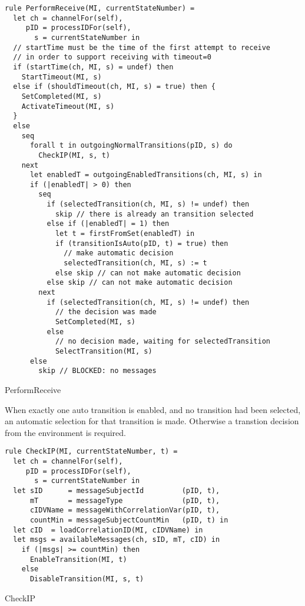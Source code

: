 \begin{listing}[H]
\begin{verbatim}
rule PerformReceive(MI, currentStateNumber) =
  let ch = channelFor(self),
     pID = processIDFor(self),
       s = currentStateNumber in
  // startTime must be the time of the first attempt to receive
  // in order to support receiving with timeout=0
  if (startTime(ch, MI, s) = undef) then
    StartTimeout(MI, s)
  else if (shouldTimeout(ch, MI, s) = true) then {
    SetCompleted(MI, s)
    ActivateTimeout(MI, s)
  }
  else
    seq
      forall t in outgoingNormalTransitions(pID, s) do
        CheckIP(MI, s, t)
    next
      let enabledT = outgoingEnabledTransitions(ch, MI, s) in
      if (|enabledT| > 0) then
        seq
          if (selectedTransition(ch, MI, s) != undef) then
            skip // there is already an transition selected
          else if (|enabledT| = 1) then
            let t = firstFromSet(enabledT) in
            if (transitionIsAuto(pID, t) = true) then
              // make automatic decision
              selectedTransition(ch, MI, s) := t
            else skip // can not make automatic decision
          else skip // can not make automatic decision
        next
          if (selectedTransition(ch, MI, s) != undef) then
            // the decision was made
            SetCompleted(MI, s)
          else
            // no decision made, waiting for selectedTransition
            SelectTransition(MI, s)
      else
        skip // BLOCKED: no messages
\end{verbatim}
\caption{PerformReceive}
\label{lst:shortasm:PerformReceive}
\end{listing}




When exactly one auto transition is enabled, and no transition had been selected, an
automatic selection for that transition is made. Otherwise a transtion decision from
the environment is required.




\begin{listing}[H]
\begin{verbatim}
rule CheckIP(MI, currentStateNumber, t) =
  let ch = channelFor(self),
     pID = processIDFor(self),
       s = currentStateNumber in
  let sID      = messageSubjectId         (pID, t),
      mT       = messageType              (pID, t),
      cIDVName = messageWithCorrelationVar(pID, t),
      countMin = messageSubjectCountMin   (pID, t) in
  let cID  = loadCorrelationID(MI, cIDVName) in
  let msgs = availableMessages(ch, sID, mT, cID) in
    if (|msgs| >= countMin) then
      EnableTransition(MI, t)
    else
      DisableTransition(MI, s, t)
\end{verbatim}
\caption{CheckIP}
\label{lst:shortasm:CheckIP}
\end{listing}


